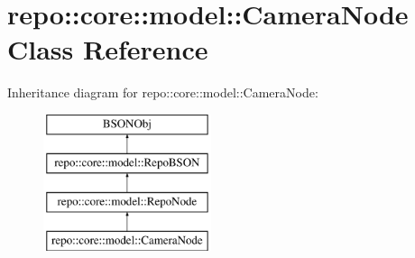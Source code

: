 \hypertarget{classrepo_1_1core_1_1model_1_1_camera_node}{}\section{repo\+:\+:core\+:\+:model\+:\+:Camera\+Node Class Reference}
\label{classrepo_1_1core_1_1model_1_1_camera_node}
Inheritance diagram for repo\+:\+:core\+:\+:model\+:\+:Camera\+Node\+:\begin{figure}[H]
\begin{center}
\leavevmode
\includegraphics[height=4.000000cm]{classrepo_1_1core_1_1model_1_1_camera_node}
\end{center}
\end{figure}
